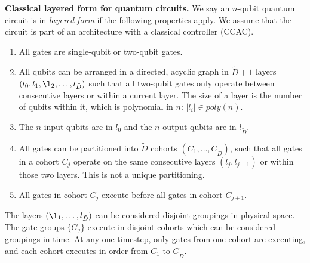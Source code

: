 \begin{definition}{\textbf{Classical layered form for quantum circuits.}}
We say an $n$-qubit quantum circuit is in \emph{layered form} if the following
properties apply. We assume that the circuit is part of an architecture
with a classical controller (\textsf{CCAC}).

\begin{enumerate}
\item
All gates are single-qubit or two-qubit gates.
\item
All qubits can be arranged in a directed, acyclic graph in $\tilde{D}+1$
layers $(l_0, l_1, \l_2, \ldots, l_{\tilde{D}})$
such that all two-qubit gates only operate between consecutive layers or
within a current layer. The size of a layer is the number of qubits within it,
which is polynomial in $n$: $|l_i| \in poly(n)$.
\item The $n$ input qubits are in $l_0$ and the $n$ output qubits are
in $l_{\tilde{D}}$.
\item All gates can be partitioned into $\tilde{D}$ cohorts $(C_1, \ldots, C_{\tilde{D}})$,
such that all gates in a cohort $C_j$
operate on the same consecutive layers $(l_{j}, l_{j+1})$
or within those two layers.
This is not a unique partitioning.

\item
All gates in cohort $C_j$ execute before all gates in cohort $C_{j+1}$.
\end{enumerate}
\label{def:lqc}
\end{definition}

The layers $(\l_1, \ldots, l_{\tilde{D}})$ can be considered disjoint groupings in
physical space.
The gate groups $\{ G_j \}$ execute in disjoint cohorts which can be considered
groupings in time. At any one timestep, only gates from one cohort are executing,
and each cohort executes in order from $C_1$ to $C_{\tilde{D}}$.


